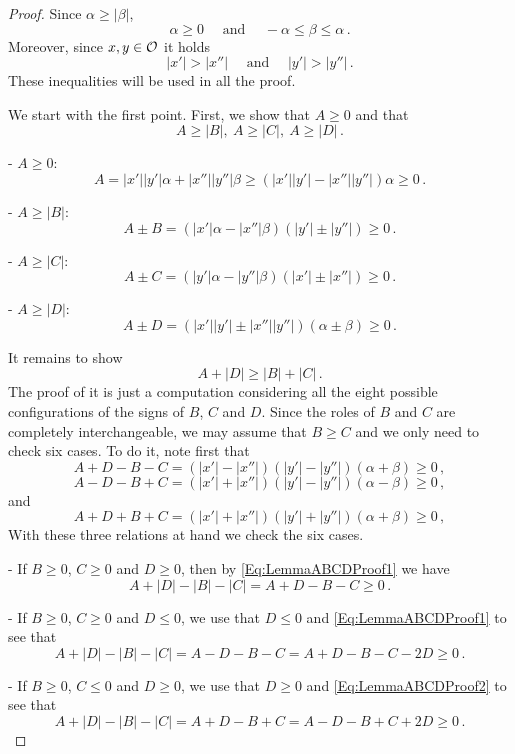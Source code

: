 \begin{proof}
Since $\alpha \geq |\beta |$,
$$
\alpha\geq 0 \quad \textrm{ and } \quad  -\alpha \leq \beta \leq \alpha\,.
$$
Moreover, since $x,y\in\mathcal{O}$ it holds
$$
|x'|>|x''| \quad \textrm{ and } \quad |y'|>|y''|\,.
$$
These inequalities will be used in all the proof.

We start with the first point. First,  we show that $A\geq 0$ and that
$$
A \geq |B|, \ A \geq |C| ,\ A \geq |D|\,.
$$


- $A \geq 0$:
$$
 A =  |x'||y'|  \alpha + |x''||y''|\beta \geq (|x'||y'|  - |x''||y''|)\alpha \geq 0\,.
$$

- $A \geq |B|$:
$$
A\pm B = (|x'|\alpha-|x''|\beta)(|y'|\pm |y''|) \geq 0\,.
$$

- $A \geq |C|$:
$$
A\pm C = (|y'|\alpha-|y''|\beta)(|x'|\pm |x''|)  \geq 0\,.
$$

- $A \geq |D|$:
$$
A\pm D = (|x'||y'| \pm |x''||y''|)(\alpha \pm \beta) \geq 0\,.
$$


It remains to show
$$
A + |D| \geq |B| + |C|\,.
$$
The proof of it is just a computation considering all the eight possible configurations of the
signs of $B$, $C$ and $D$. Since the roles of $B$ and $C$ are completely interchangeable, we may
assume that $B \geq C$ and we only need to check six cases. To do it, note first that
\begin{equation}
\label{Eq:LemmaABCDProof1}
A + D - B - C = (|x'|-|x''|)(|y'|-|y''|)(\alpha + \beta) \geq 0 \,,
\end{equation}
\begin{equation}
\label{Eq:LemmaABCDProof2}
A - D - B + C = (|x'|+|x''|)(|y'|-|y''|)(\alpha - \beta) \geq 0 \,,
\end{equation}
and
\begin{equation}
\label{Eq:LemmaABCDProof3}
A + D + B + C = (|x'|+|x''|)(|y'|+|y''|)(\alpha + \beta) \geq 0 \,,
\end{equation}
With these three relations at hand we check the six cases.

- If $B \geq 0$, $C \geq 0$ and $D \geq 0$, then by \eqref{Eq:LemmaABCDProof1} we have
$$
A + |D| - |B| - |C| = A + D - B - C \geq 0\,.
$$

- If $B \geq 0$, $C \geq 0$ and $D \leq 0$, we use that $D\leq 0$ and \eqref{Eq:LemmaABCDProof1} to
see that
$$
A + |D| - |B| - |C| = A - D - B - C =  A + D - B - C -2D \geq 0\,.
$$

- If $B \geq 0$, $C \leq 0$ and $D \geq 0$, we use that $D\geq 0$ and \eqref{Eq:LemmaABCDProof2} to
see that
$$
A + |D| - |B| - |C| = A + D - B + C =  A - D - B + C +2D \geq 0\,.
$$


\end{proof}
